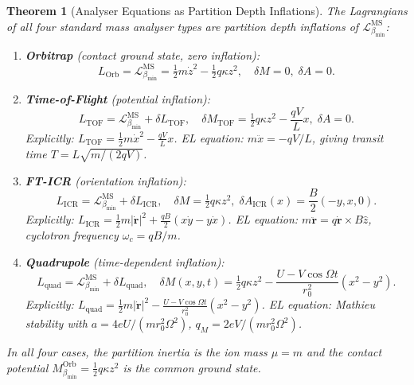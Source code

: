 \documentclass[11pt,twocolumn,a4paper]{article}
\theoremstyle{plain}
\newtheorem{theorem}{Theorem}[section]
\theoremstyle{definition}
\theoremstyle{remark}
\newcommand{\bmin}{\beta_{\min}}
\newcommand{\Lmin}{\mathcal{L}_{\bmin}}
\newcommand{\half}{\tfrac{1}{2}}
\begin{document}
\begin{theorem}[Analyser Equations as Partition Depth Inflations]
\label{thm:inflations}
The Lagrangians of all four standard mass analyser types are partition depth
inflations of $\Lmin^{\mathrm{MS}}$:

\begin{enumerate}[label=(\roman*)]
\item \textbf{Orbitrap} (contact ground state, zero inflation):
\[
  L_{\mathrm{Orb}} = \Lmin^{\mathrm{MS}} = \half m\dot{z}^2 - \half q\kappa z^2,
  \quad \delta M = 0,\;\delta A = 0.
\]

\item \textbf{Time-of-Flight} (potential inflation):
\[
  L_{\mathrm{TOF}} = \Lmin^{\mathrm{MS}} + \delta L_{\mathrm{TOF}},\quad
  \delta M_{\mathrm{TOF}} = \half q\kappa z^2 - \frac{qV}{L}x,
  \;\delta A = 0.
\]
Explicitly: $L_{\mathrm{TOF}} = \half m\dot{x}^2 - \frac{qV}{L}x$.
EL equation: $m\ddot{x} = -qV/L$, giving transit time $T = L\sqrt{m/(2qV)}$.

\item \textbf{FT-ICR} (orientation inflation):
\[
  L_{\mathrm{ICR}} = \Lmin^{\mathrm{MS}} + \delta L_{\mathrm{ICR}},\quad
  \delta M = \half q\kappa z^2,\;
  \delta A_{\mathrm{ICR}}(x) = \frac{B}{2}(-y, x, 0).
\]
Explicitly: $L_{\mathrm{ICR}} = \half m|\dot{\mathbf{r}}|^2 + \frac{qB}{2}
(x\dot{y} - y\dot{x})$.
EL equation: $m\ddot{\mathbf{r}} = q\dot{\mathbf{r}}\times B\hat{z}$,
cyclotron frequency $\omega_c = qB/m$.

\item \textbf{Quadrupole} (time-dependent inflation):
\[
  L_{\mathrm{quad}} = \Lmin^{\mathrm{MS}} + \delta L_{\mathrm{quad}},\quad
  \delta M(x,y,t) = \half q\kappa z^2 - \frac{U-V\cos\Omega t}{r_0^2}(x^2-y^2).
\]
Explicitly: $L_{\mathrm{quad}} = \half m|\dot{\mathbf{r}}|^2 -
\frac{U-V\cos\Omega t}{r_0^2}(x^2-y^2)$.
EL equation: Mathieu stability with $a = 4eU/(mr_0^2\Omega^2)$,
$q_M = 2eV/(mr_0^2\Omega^2)$.
\end{enumerate}

In all four cases, the partition inertia is the ion mass $\mu = m$ and the
contact potential $M_{\bmin}^{\mathrm{Orb}} = \half q\kappa z^2$ is the
common ground state.
\end{theorem}
\end{document}
